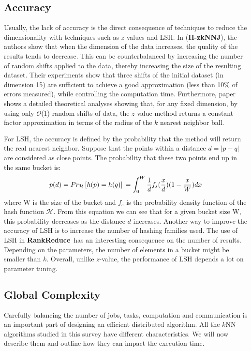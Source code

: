 \documentclass[10pt,journal,compsoc]{IEEEtran}
\newcommand{\Z}{{\bf H-zkNNJ}}
\newcommand{\LSH}{{\bf RankReduce}}
\begin{document}
\subsection{Accuracy}

Usually, the lack of accuracy is the direct consequence of techniques to reduce the 
dimensionality with techniques such as $z$-values and LSH. In 
\cite{Zhang:2012:EPK:2247596.2247602} (\Z), the authors show that when the dimension of the 
data increases, the quality of 
the results tends to decrease. This can be counterbalanced by increasing the number of random 
shifts applied to the data, thereby 
increasing the size of the resulting dataset. Their experiments show that three 
shifts of the initial dataset (in dimension 15) are sufficient to achieve a good approximation 
(less than 10\% of errors measured), while controlling the computation time. 
Furthermore, paper \cite{5447837_full} shows a detailed theoretical analyses showing that, for any fixed dimension, by using only $\mathcal{O}$(1) random shifts of data, the $z$-value method returns a constant factor approximation in terms of the radius of the $k$ nearest neighbor ball.

For LSH, the accuracy is defined by the probability that the method will return the real nearest neighbor. Suppose that 
the points within a distance $d = \left|p-q\right|$ are considered as close points. The probability \cite{4472264} that 
these two points end up in the same bucket is: 
\begin{equation}
p(d) = Pr_\mathcal{H}\left[h(p)=h(q)\right] \\
=\int_{0}^{W} \frac{1}{d} f_s (\frac{x}{d})(1-\frac{x}{W})dx
\end{equation}
where W is the size of the bucket and $f_s$ is the probability density function of the hash function $\mathcal{H}$. 
From this equation we can see that for a given bucket size W, this probability decreases as the distance $d$ 
increases. Another way to improve the accuracy of LSH is to increase the number of hashing families
used. The use of LSH in \LSH~has an interesting consequence on the number of results. Depending on the parameters, 
the number of elements in a bucket might be smaller than $k$. 
Overall, unlike $z$-value, the performance of LSH depends a lot on parameter tuning. 
%
\subsection{Global Complexity}
\label{section:global_complexity}
Carefully balancing the number of jobs, tasks, computation and communication 
is an important part of designing an efficient distributed algorithm.
All the $k$NN algorithms studied in this survey have different characteristics. We will now describe them 
and outline how they can impact the execution time. 
\end{document}
